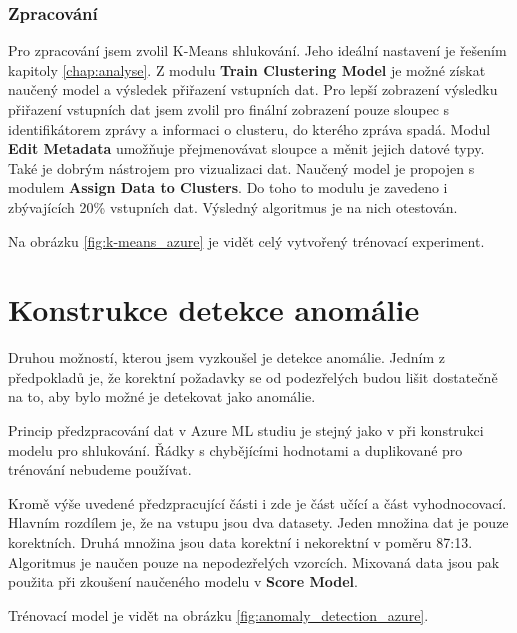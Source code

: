 \documentclass[thesis=M,czech]{FITthesis}[2012/10/20]
\begin{document}
		\subsubsection{Zpracování}
		Pro zpracování jsem zvolil K-Means shlukování. Jeho ideální nastavení je řešením kapitoly \ref{chap:analyse}. Z modulu \textbf{Train Clustering Model} je možné získat naučený model a výsledek přiřazení vstupních dat. Pro lepší zobrazení výsledku přiřazení vstupních dat jsem zvolil pro finální zobrazení pouze sloupec s identifikátorem zprávy a informaci o clusteru, do kterého zpráva spadá. Modul \textbf{Edit Metadata} umožňuje přejmenovávat sloupce a měnit jejich datové typy. Také je dobrým nástrojem pro vizualizaci dat. Naučený model je propojen s modulem \textbf{Assign Data to Clusters}. Do toho to modulu je zavedeno i zbývajících 20\% vstupních dat. Výsledný algoritmus je na nich otestován.
		
		Na obrázku \ref{fig:k-means_azure} je vidět celý vytvořený trénovací experiment.
	
	\section{Konstrukce detekce anomálie}
		\label{sec:construc_anomaly}
		Druhou možností, kterou jsem vyzkoušel je detekce anomálie. Jedním z předpokladů je, že korektní požadavky se od podezřelých budou lišit dostatečně na to, aby bylo možné je detekovat jako anomálie.
		
		Princip předzpracování dat v Azure ML studiu je stejný jako v při konstrukci modelu pro shlukování. Řádky s chybějícími hodnotami a duplikované pro trénování nebudeme používat.
		
		Kromě výše uvedené předzpracující části i zde je část učící a část vyhodnocovací. Hlavním rozdílem je, že na vstupu jsou dva datasety. Jeden množina dat je pouze korektních. Druhá množina jsou data korektní i nekorektní v poměru 87:13. Algoritmus je naučen pouze na nepodezřelých vzorcích. Mixovaná data jsou pak použita při zkoušení naučeného modelu v \textbf{Score Model}.
		
		Trénovací model je vidět na obrázku \ref{fig:anomaly_detection_azure}.
		
\end{document}
